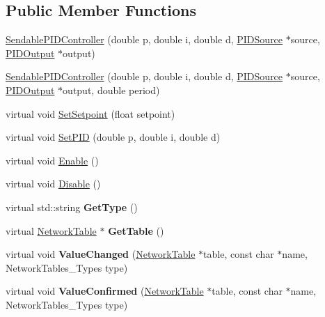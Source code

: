 \subsection*{Public Member Functions}
\begin{DoxyCompactItemize}
\item 
\hyperlink{classSendablePIDController_a2b1112562b5283e9e5774890f2e1c029}{SendablePIDController} (double p, double i, double d, \hyperlink{classPIDSource}{PIDSource} $\ast$source, \hyperlink{classPIDOutput}{PIDOutput} $\ast$output)
\item 
\hyperlink{classSendablePIDController_a77118bbfcf49796898d9f52f6c500e06}{SendablePIDController} (double p, double i, double d, \hyperlink{classPIDSource}{PIDSource} $\ast$source, \hyperlink{classPIDOutput}{PIDOutput} $\ast$output, double period)
\item 
virtual void \hyperlink{classSendablePIDController_a1698ad2f4e608211458d7eb17d9c29bc}{SetSetpoint} (float setpoint)
\item 
virtual void \hyperlink{classSendablePIDController_a4386f8c1af6063189b8f0db2ec4e6228}{SetPID} (double p, double i, double d)
\item 
virtual void \hyperlink{classSendablePIDController_a08782e10dfdb2941016c1a55afeca8b2}{Enable} ()
\item 
virtual void \hyperlink{classSendablePIDController_a82a46d297b6199c4aa98957c48ec75f0}{Disable} ()
\item 
\hypertarget{classSendablePIDController_aebfe601b8a982b00aa8ff027fcb7c4cf}{
virtual std::string {\bfseries GetType} ()}
\label{classSendablePIDController_aebfe601b8a982b00aa8ff027fcb7c4cf}

\item 
\hypertarget{classSendablePIDController_ac2a0b98de04feecfd788cd6973456258}{
virtual \hyperlink{classNetworkTable}{NetworkTable} $\ast$ {\bfseries GetTable} ()}
\label{classSendablePIDController_ac2a0b98de04feecfd788cd6973456258}

\item 
\hypertarget{classSendablePIDController_a060ea84fe40e527d71edb00e74f2ca9c}{
virtual void {\bfseries ValueChanged} (\hyperlink{classNetworkTable}{NetworkTable} $\ast$table, const char $\ast$name, NetworkTables\_\-Types type)}
\label{classSendablePIDController_a060ea84fe40e527d71edb00e74f2ca9c}

\item 
\hypertarget{classSendablePIDController_aea36a5e164404b794447f46b7e82bcb7}{
virtual void {\bfseries ValueConfirmed} (\hyperlink{classNetworkTable}{NetworkTable} $\ast$table, const char $\ast$name, NetworkTables\_\-Types type)}
\label{classSendablePIDController_aea36a5e164404b794447f46b7e82bcb7}

\end{DoxyCompactItemize}


